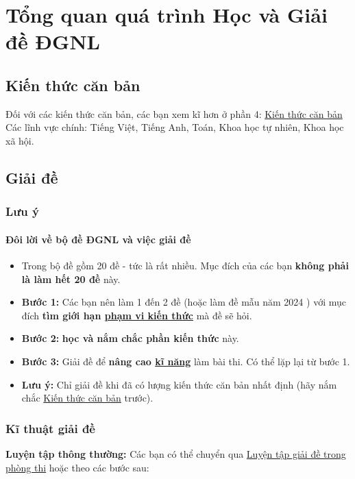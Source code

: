 \section{Tổng quan quá trình Học và Giải đề ĐGNL}
\subsection{Kiến thức căn bản}\label{sec:basic}
Đối với các kiến thức căn bản, các bạn xem kĩ hơn ở phần 4: \hyperref[sec:bigbasic]{Kiến thức căn bản}
\\Các lĩnh vực chính: Tiếng Việt, Tiếng Anh, Toán, Khoa học tự nhiên, Khoa học xã hội.
\subsection{Giải đề}
\subsubsection{Lưu ý}

\paragraph{Đôi lời về bộ đề ĐGNL và việc giải đề}

\begin{itemize}
    \item Trong bộ đề gồm 20 đề - tức là rất nhiều. Mục đích của các bạn \textbf{không phải là làm hết 20 đề} này.
    \item \textbf{Bước 1:} Các bạn nên làm 1 đến 2 đề (hoặc làm đề mẫu năm 2024 \cite{demau2024}) với mục đích \textbf{tìm giới hạn  \hyperref[sec:phamvikienthuc]{phạm vi kiến thức}} mà đề sẽ hỏi. 
    \item \textbf{Bước 2:} \textbf{học và nắm chắc phần kiến thức} này.
    \item \textbf{Bước 3:} Giải đề để \textbf{nâng cao \hyperref[sec:kinanglambai]{kĩ năng}} làm bài thi. Có thể lặp lại từ bước 1.
    \item \textbf{Lưu ý:} Chỉ giải đề khi đã có lượng kiến thức căn bản nhất định (hãy nắm chắc \hyperref[sec:basic]{Kiến thức căn bản} trước). 
\end{itemize}

\subsubsection{Kĩ thuật giải đề}
\textbf{Luyện tập thông thường:} Các bạn có thể chuyển qua \hyperref[sec:giaidephongthi]{Luyện tập giải đề trong phòng thi} hoặc theo các bước sau:

